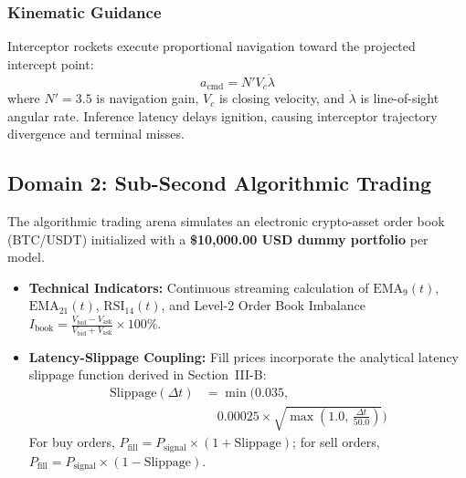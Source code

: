 \documentclass[journal,compsoc]{IEEEtran}
\begin{document}
\subsubsection{Kinematic Guidance}
Interceptor rockets execute proportional navigation toward the projected intercept point:
\begin{equation}
a_{\text{cmd}} = N' V_c \dot{\lambda}
\end{equation}
where $N'=3.5$ is navigation gain, $V_c$ is closing velocity, and $\dot{\lambda}$ is line-of-sight angular rate. Inference latency delays ignition, causing interceptor trajectory divergence and terminal misses.

\subsection{Domain 2: Sub-Second Algorithmic Trading}
The algorithmic trading arena simulates an electronic crypto-asset order book (BTC/USDT) initialized with a \textbf{\$10,000.00 USD dummy portfolio} per model.
\begin{itemize}
    \item \textbf{Technical Indicators:} Continuous streaming calculation of $\text{EMA}_9(t)$, $\text{EMA}_{21}(t)$, $\text{RSI}_{14}(t)$, and Level-2 Order Book Imbalance $I_{\text{book}} = \frac{V_{\text{bid}} - V_{\text{ask}}}{V_{\text{bid}} + V_{\text{ask}}} \times 100\%$.
    \item \textbf{Latency-Slippage Coupling:} Fill prices incorporate the analytical latency slippage function derived in Section~III-B:
    \begin{equation}
    \begin{aligned}
    \text{Slippage}(\Delta t) &= \min \Big( 0.035, \\
    &\quad 0.00025 \times \sqrt{\max\left(1.0, \, \frac{\Delta t}{50.0}\right)} \Big)
    \end{aligned}
    \end{equation}
    For buy orders, $P_{\text{fill}} = P_{\text{signal}} \times (1 + \text{Slippage})$; for sell orders, $P_{\text{fill}} = P_{\text{signal}} \times (1 - \text{Slippage})$.
\end{itemize}
\end{document}

